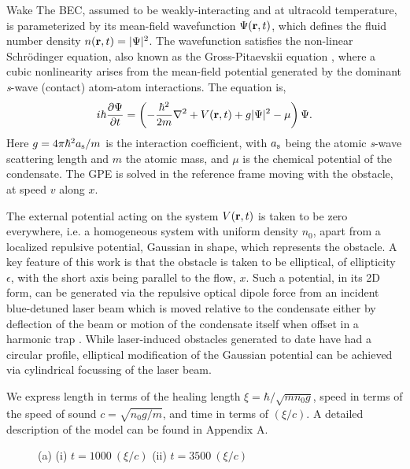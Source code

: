 \begin{chapter}{\label{cha:wake}Wake}
The BEC, assumed to be weakly-interacting and at ultracold temperature, is parameterized by its mean-field wavefunction $\Psi({\bf r},t)$, which defines the fluid number density $n({\bf r}, t)=|\Psi|^2$.  The wavefunction satisfies the non-linear Schr{\"o}dinger equation, also known as the Gross-Pitaevskii equation \cite{Pethick}, where a cubic nonlinearity arises from the mean-field potential generated by the dominant {\it s}-wave (contact) atom-atom interactions. The equation is,  
\begin{equation}
i \hbar \frac{\partial\Psi}{\partial t} = \left(-\frac{\hbar^2}{2m}\nabla^2 + V({\bf r},t) + g|\Psi|^2 - \mu \right) \Psi.
\label{eq:gpe1}
\end{equation} 
Here $g=4 \pi \hbar^2 a_{\rm s}/m$ is the interaction coefficient, with $a_{\rm s}$ being the atomic {\it s}-wave scattering length and $m$ the atomic mass, and $\mu$ is the chemical potential of the condensate.  The GPE is solved in the reference frame moving with the obstacle, at speed $v$ along $x$.  

The external potential acting on the system $V({\bf r}, t)$ is taken to be zero everywhere, i.e. a homogeneous system with uniform density $n_0$, apart from a localized repulsive potential, Gaussian in shape, which represents the obstacle.  A key feature of this work is that the obstacle is taken to be elliptical, of ellipticity $\epsilon$, with the short axis being parallel to the flow, $x$.    Such a potential, in its 2D form, can be generated via the repulsive optical dipole force from an incident blue-detuned laser beam which is moved relative to the condensate either by deflection of the beam \cite{Raman,Onofrio,Inouye} or motion of the condensate itself when offset in a harmonic trap \cite{Neely}.  While laser-induced obstacles generated to date have had a circular profile, elliptical modification of the Gaussian potential can be achieved via cylindrical focussing of the laser beam.   


We express length in terms of the healing length $\xi = \hbar/\sqrt{m n_0 g}$, speed in terms of the speed of sound $c=\sqrt{n_0 g/m}$, and time in terms of $(\xi/c)$.
A detailed description of the model can be found in Appendix A.

\begin{figure}
(a) \hspace{1.8cm} (i)  $t = 1000 ~(\xi/c)$ \hspace{2.4cm} \hspace{1.8cm} (ii)   $t= 3500~ (\xi/c)$
\\
\vspace{-0.3cm}


\end{figure}
\end{chapter}
